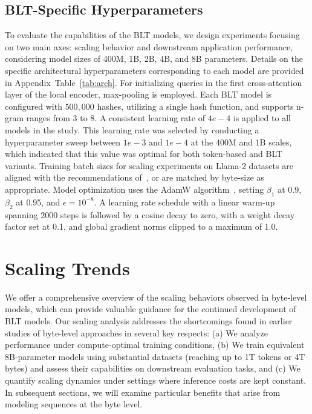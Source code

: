 \subsection{{\textsc BLT}-Specific Hyperparameters} To evaluate the capabilities of the {\textsc BLT} models, we design experiments focusing on two main axes: scaling behavior and downstream application performance, considering model sizes of 400M, 1B, 2B, 4B, and 8B parameters. Details on the specific architectural hyperparameters corresponding to each model are provided in Appendix~Table~\ref{tab:arch}. 
For initializing queries in the first cross-attention layer of the local encoder, max-pooling is employed. Each {\textsc BLT} model is configured with $500,000$ hashes, utilizing a single hash function, and supports n-gram ranges from 3 to 8. A consistent learning rate of $4e-4$ is applied to all models in the study. This learning rate was selected by conducting a hyperparameter sweep between $1e-3$ and $1e-4$ at the 400M and 1B scales, which indicated that this value was optimal for both token-based and {\textsc BLT} variants. Training batch sizes for scaling experiments on Llama-2 datasets are aligned with the recommendations of~\cite{dubey2024llama}, or are matched by byte-size as appropriate. Model optimization uses the AdamW algorithm~\citep{adamw}, setting $\beta_1$ at 0.9, $\beta_2$ at 0.95, and $\epsilon=10^{-8}$. A learning rate schedule with a linear warm-up spanning 2000 steps is followed by a cosine decay to zero, with a weight decay factor set at 0.1, and global gradient norms clipped to a maximum of 1.0.

\section{Scaling Trends}
\label{section:scaling}

We offer a comprehensive overview of the scaling behaviors observed in byte-level models, which can provide valuable guidance for the continued development of {\textsc BLT} models. Our scaling analysis addresses the shortcomings found in earlier studies of byte-level approaches in several key respects: (a) We analyze performance under compute-optimal training conditions, (b) We train equivalent 8B-parameter models using substantial datasets (reaching up to 1T tokens or 4T bytes) and assess their capabilities on downstream evaluation tasks, and (c) We quantify scaling dynamics under settings where inference costs are kept constant. In subsequent sections, we will examine particular benefits that arise from modeling sequences at the byte level.

